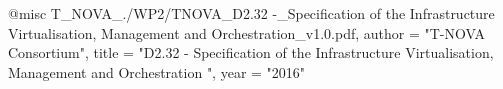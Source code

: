 @misc{ T_NOVA_./WP2/TNOVA_D2.32 -_Specification of the Infrastructure Virtualisation, Management and Orchestration_v1.0.pdf,
       author = "T-NOVA Consortium",
       title = "D2.32 - Specification of the Infrastructure Virtualisation, Management and Orchestration ",
       year = "2016" }
